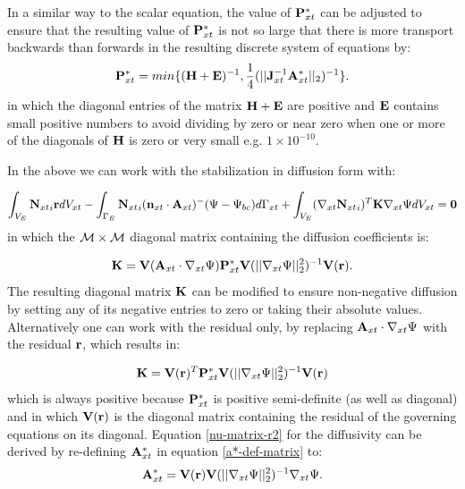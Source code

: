  In a similar way to the scalar equation, the value of
${\bf P}_{xt}^*$ can be adjusted to ensure
that the resulting value of ${\bf P}_{xt}^* $
is not so large that there is
more transport backwards than forwards in the resulting discrete
system of equations by:
\begin{equation}
 {\bf P}_{xt}^* = min\{ ({\bf H}+{\bf E})^{-1},
 \frac{1}{4} (\vert\vert {\bf J}_{xt}^{-1} {\bf A}_{xt}^* \vert\vert_2 )^{-1} \}.
\label{p*-def-j-lim}
\end{equation}
in which the diagonal entries of the matrix ${\bf H}+{\bf E}$ are positive and ${\bf E}$
contains small positive numbers to avoid dividing by zero or near zero
when one or more of the
diagonals of ${\bf H}$ is zero or very small e.g. $1\times 10^{-10}$.

In the above we can work with the stabilization in diffusion form with:


\begin{equation}
 \int_{V_E}
 {{\bf N}_{xt}}_i {\bf r} d V_{xt}
 - \int_{\Gamma_E} {{\bf N}_{xt}}_i ({\bf n}_{xt} \cdot {\bf A}_{xt})^-  (\Psi-\Psi_{bc})
 d \Gamma_{xt}
 +
  \int_{V_E} ({\nabla_{xt}} {{\bf N}_{xt}}_i )^T {\bf K}  {\nabla_{xt}} \Psi d V_{xt}
 ={\bf 0}
\label{disc-xt-matrix}
\end{equation}
 in which the ${\cal M}\times {\cal M}$ diagonal matrix containing
 the diffusion coefficients is:

\begin{equation}
 {\bf K} = {{\bf V}({\bf A}_{xt}\cdot {\nabla_{xt}} \Psi) {\bf P}_{xt}^* }{\bf V}({\vert\vert {\nabla_{xt}} \Psi \vert\vert^2_2})^{-1} {\bf V}({\bf r}).
\label{nu-matrix}
\end{equation}
The resulting diagonal matrix ${\bf K}$ can be modified to ensure
non-negative diffusion
by setting any of its negative entries to zero
or taking their absolute values.
Alternatively one can work with the residual only, by
 replacing ${\bf A}_{xt}\cdot {\nabla_{xt}} \Psi$ with the residual ${\bf r}$,
 which results in:

\begin{equation}
 {\bf K} = {{\bf V}({\bf r})^T {\bf P}_{xt}^*
 {\bf V}({\vert\vert {\nabla_{xt}} \Psi \vert\vert^2_2})^{-1} {\bf V}({\bf r})}
\label{nu-matrix-r2}
\end{equation}
 which is always positive because ${\bf P}_{xt}^*$ is positive semi-definite
 (as well as diagonal)
 and in which ${\bf V}({\bf r})$ is the diagonal matrix
 containing the residual of the governing equations on its diagonal.
 Equation \ref{nu-matrix-r2} for the diffusivity can be derived by
 re-defining ${\bf A}_{xt}^*$ in equation \ref{a*-def-matrix} to:
\begin{equation}
 {\bf A}_{xt}^* = {{\bf V}({\bf r})}
 {\bf V}({\vert\vert{\nabla_{xt}} \Psi\vert\vert^2_2})^{-1} {\nabla_{xt}} \Psi.
\label{a*-def-matrix-r}
\end{equation}




